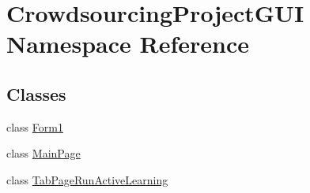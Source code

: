 \hypertarget{namespace_crowdsourcing_project_g_u_i}{}\section{Crowdsourcing\+Project\+G\+U\+I Namespace Reference}
\label{namespace_crowdsourcing_project_g_u_i}
\subsection*{Classes}
\begin{DoxyCompactItemize}
\item 
class \hyperlink{class_crowdsourcing_project_g_u_i_1_1_form1}{Form1}
\item 
class \hyperlink{class_crowdsourcing_project_g_u_i_1_1_main_page}{Main\+Page}
\item 
class \hyperlink{class_crowdsourcing_project_g_u_i_1_1_tab_page_run_active_learning}{Tab\+Page\+Run\+Active\+Learning}
\end{DoxyCompactItemize}
